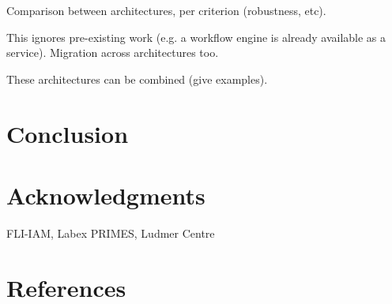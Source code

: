 \documentclass[preprint,3p,twocolumn]{elsarticle}
\begin{document}
Comparison between architectures, per criterion (robustness, etc).

This ignores pre-existing work (e.g. a workflow engine is already available as a service). Migration across architectures too.

These architectures can be combined (give examples). 

\section{Conclusion}

\section{Acknowledgments}

FLI-IAM, Labex PRIMES, Ludmer Centre

\section*{References}

 

\end{document}
